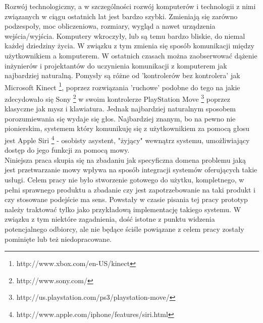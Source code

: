 

\begin{abstracts}        %

Rozwój technologiczny, a w szczególności rozwój komputerów i technologii z nimi związanych w ciągu ostatnich lat jest bardzo szybki. Zmieniają się zarówno podzespoły, moc obliczeniowa, rozmiary, wygląd a nawet urządzenia wejścia/wyjścia. Komputery wkroczyły, lub są temu bardzo bliskie, do niemal każdej dziedziny życia. W związku z tym zmienia się sposób komunikacji między użytkownikiem a komputerem. W ostatnich czasach można zaobserwować dążenie inżynierów i projektantów do uczynienia komunikacji z komputerem jak najbardziej naturalną. Pomysły są różne od 'kontrolerów bez kontrolera' jak Microsoft Kinect \footnote {http://www.xbox.com/en-US/kinect}, poprzez rozwiązania 'ruchowe' podobne do tego na jakie zdecydowało się Sony \footnote{http://www.sony.com/} w swoim kontrolerze PlayStation Move \footnote{http://us.playstation.com/ps3/playstation-move/} poprzez klasyczne  jak mysz i klawiatura. Jednak najbardziej naturalnym sposobem porozumiewania się wydaje się głos. Najbardziej znanym, bo na pewno nie pionierskim, systemem który komunikuję się z użytkownikiem za pomocą głosu jest Apple Siri \footnote{http://www.apple.com/iphone/features/siri.html} - osobisty asystent, "żyjący" wewnątrz systemu, umożliwiający dostęp do jego funkcji za pomocą mowy.\\
Niniejsza praca skupia się na zbadaniu jak specyficzna domena problemu jaką jest przetwarzanie mowy wpływa na sposób integracji systemów oferujących takie usługi. Celem pracy nie było stworzenie gotowego do użytku, kompletnego, w pełni sprawnego produktu a zbadanie czy jest zapotrzebowanie na taki produkt i czy stosowane podejście ma sens. Powstały w czasie pisania tej pracy prototyp należy traktować tylko jako przykładową implementację takiego systemu. W związku z tym niektóre zagadnienia, dość istotne z punktu widzenia potencjalnego odbiorcy, ale nie będące ściśle powiązane z celem pracy zostały pominięte lub też niedopracowane. 
\end{abstracts}


